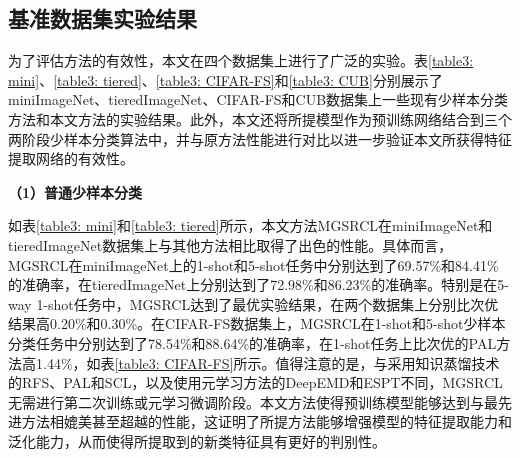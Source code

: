 \subsection[\hspace{-2pt}基准数据集实验结果]{{\heiti{} \hspace{-8pt}基准数据集实验结果}}\label{section3: 基准数据集实验结果}

为了评估方法的有效性，本文在四个数据集上进行了广泛的实验。表\ref{table3: mini}、\ref{table3: tiered}、\ref{table3: CIFAR-FS}和\ref{table3: CUB}分别展示了miniImageNet、tieredImageNet、CIFAR-FS和CUB数据集上一些现有少样本分类方法和本文方法的实验结果。此外，本文还将所提模型作为预训练网络结合到三个两阶段少样本分类算法中，并与原方法性能进行对比以进一步验证本文所获得特征提取网络的有效性。


\textbf{（1）普通少样本分类}

如表\ref{table3: mini}和\ref{table3: tiered}所示，本文方法MGSRCL在miniImageNet和tieredImageNet数据集上与其他方法相比取得了出色的性能。具体而言，MGSRCL在miniImageNet上的1-shot和5-shot任务中分别达到了69.57\%和84.41\%的准确率，在tieredImageNet上分别达到了72.98\%和86.23\%的准确率。特别是在5-way 1-shot任务中，MGSRCL达到了最优实验结果，在两个数据集上分别比次优结果高0.20\%和0.30\%。在CIFAR-FS数据集上，MGSRCL在1-shot和5-shot少样本分类任务中分别达到了78.54\%和88.64\%的准确率，在1-shot任务上比次优的PAL方法高1.44\%，如表\ref{table3: CIFAR-FS}所示。值得注意的是，与采用知识蒸馏技术的RFS\cite{RFS}、PAL\cite{PAL}和SCL\cite{Spatial}，以及使用元学习方法的DeepEMD\cite{DeepEMD}和ESPT\cite{ESPT}不同，MGSRCL无需进行第二次训练或元学习微调阶段。本文方法使得预训练模型能够达到与最先进方法相媲美甚至超越的性能，这证明了所提方法能够增强模型的特征提取能力和泛化能力，从而使得所提取到的新类特征具有更好的判别性。

